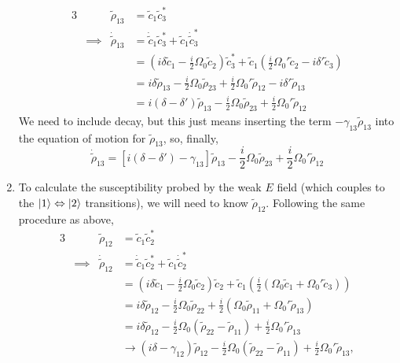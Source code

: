 \documentclass[12pt]{article}
\begin{document}
\begin{enumerate}[label=(\alph*)]
    \begin{alignat*}{3}
        &\quad & \tilde{\rho}_{13} &= \tilde{c}_1\tilde{c}_3^* \\
        &\implies & \dot{\tilde{\rho}}_{13} &= \dot{\tilde{c}}_1\tilde{c}_3^* + \tilde{c}_1\dot{\tilde{c}}_3^* \\
        & & &= \left(i\delta\tilde{c}_1 - \frac{i}{2}\Omega_0\tilde{c}_2 \right)\tilde{c}_3^* + \tilde{c}_1\left(\frac{i}{2}\Omega_0' \tilde{c}_2 - i\delta'\tilde{c}_3\right) \\
        & & &= i\delta\tilde{\rho}_{13} - \frac{i}{2}\Omega_0\tilde{\rho}_{23}  + \frac{i}{2}\Omega_0' \tilde{\rho}_{12} - i\delta'\tilde{\rho}_{13} \\
        & & &= i(\delta - \delta')\tilde{\rho}_{13} - \frac{i}{2}\Omega_0\tilde{\rho}_{23}  + \frac{i}{2}\Omega_0' \tilde{\rho}_{12}
    \end{alignat*}
    We need to include decay, but this just means inserting the term $-\gamma_{13}\tilde{\rho}_{13}$ into the equation of motion for $\tilde{\rho}_{13}$, so, finally,
    \[ \dot{\tilde{\rho}}_{13} = \left[i(\delta - \delta') - \gamma_{13}\right]\tilde{\rho}_{13} - \frac{i}{2}\Omega_0\tilde{\rho}_{23}  + \frac{i}{2}\Omega_0' \tilde{\rho}_{12} \]
    \item To calculate the susceptibility probed by the weak $E$ field (which couples to the $\ket{1}\Leftrightarrow\ket{2}$ transitions), we will need to know $\tilde{\rho}_{12}$.
    Following the same procedure as above,
    \begin{alignat*}{3}
        &\quad & \tilde{\rho}_{12} &= \tilde{c}_1\tilde{c}_2^* \\
        &\implies & \dot{\tilde{\rho}}_{12} &= \dot{\tilde{c}}_1\tilde{c}_2^* + \tilde{c}_1\dot{\tilde{c}}_2^* \\
        & & &= \left(i\delta\tilde{c}_1 - \frac{i}{2}\Omega_0\tilde{c}_2\right)\tilde{c}_2 + \tilde{c}_1\left(\frac{i}{2}\left(\Omega_0\tilde{c}_1 + \Omega_0'\tilde{c}_3\right)\right) \\
        & & &= i\delta\tilde{\rho}_{12} - \frac{i}{2}\Omega_0\tilde{\rho}_{22} + \frac{i}{2}\left(\Omega_0\tilde{\rho}_{11} + \Omega_0'\tilde{\rho}_{13}\right) \\ 
        & & &= i\delta\tilde{\rho}_{12} - \frac{i}{2}\Omega_0\left(\tilde{\rho}_{22}-\tilde{\rho}_{11}\right) + \frac{i}{2}\Omega_0'\tilde{\rho}_{13} \\
        & & &\to \left(i\delta - \gamma_{12}\right)\tilde{\rho}_{12} - \frac{i}{2}\Omega_0\left(\tilde{\rho}_{22}-\tilde{\rho}_{11}\right) + \frac{i}{2}\Omega_0'\tilde{\rho}_{13},

\end{alignat*}
\end{enumerate}
\end{document}
